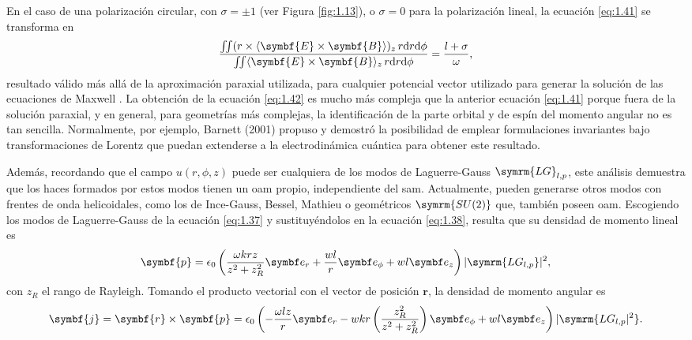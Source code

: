 En el caso de una polarización circular, con $\sigma = \pm 1$ (ver Figura \ref{fig:1.13}), o $\sigma = 0$ para la polarización lineal, la ecuación \eqref{eq:1.41} se transforma en
\begin{equation}\label{eq:1.42}
  \frac{\iint(r \times \xval{\symbf{E}\times \symbf{B}})_{z}\, r\!\diff r\!\diff \phi}{\iint \xval{\symbf{E}\times \symbf{B}}_{z}\, r\!\diff r\!\diff \phi} = \frac{l + \sigma}{\omega},
\end{equation}
resultado válido más allá de la aproximación paraxial utilizada, para cualquier potencial vector utilizado para generar la solución de las ecuaciones de Maxwell \autocite{Barnett1994}. La obtención de la ecuación \eqref{eq:1.42} es mucho más compleja que la anterior ecuación \eqref{eq:1.41} porque \autocite{Barnett2001} fuera de la solución paraxial, y en general, para geometrías más complejas, la identificación de la parte orbital y de espín del momento angular no es tan sencilla. Normalmente, por ejemplo, Barnett (2001) \autocite{Barnett2001} propuso y demostró la posibilidad de emplear formulaciones invariantes bajo transformaciones de Lorentz que puedan extenderse a la electrodinámica cuántica para obtener este resultado.

Además, recordando que el campo $u(r,\phi,z)$ puede ser cualquiera de los modos de Laguerre-Gauss $\symrm{LG}_{l,p}$, este análisis demuestra que los haces formados por estos modos tienen un \acrshort{oam} propio, independiente del \acrshort{sam}. Actualmente, pueden generarse otros modos con frentes de onda helicoidales, como los de Ince-Gauss, Bessel, Mathieu o geométricos $\symrm{SU(2)}$ que, también poseen \acrshort{oam}. Escogiendo los modos de Laguerre-Gauss de la ecuación \eqref{eq:1.37} y sustituyéndolos en la ecuación \eqref{eq:1.38}, resulta que su densidad de momento lineal es
\begin{equation}\label{eq:1.43}
  \symbf{p} = \epsilon_{0} \left(\frac{\omega k r z}{z^{2}+z_{R}^{2}}\unitvector_{r}+\frac{wl}{r}\unitvector_{\phi}+wl \unitvector_{z}\right)|\symrm{LG_{l,p}}|^{2},
\end{equation}
con $z_{R}$ el rango de Rayleigh. Tomando el producto vectorial con el vector de posición $\symbf{r}$, la densidad de momento angular es
\begin{equation}\label{eq:1.44}
  \symbf{j} = \symbf{r} \times \symbf{p} = \epsilon_{0} \left(-\frac{\omega l z}{r}\unitvector_{r}-wkr \left(\frac{z_{R}^{2}}{z^{2}+z_{R}^{2}}\right)\unitvector_{\phi}+wl \unitvector_{z}\right)|\symrm{LG_{l,p}|^{2}}.
\end{equation}

